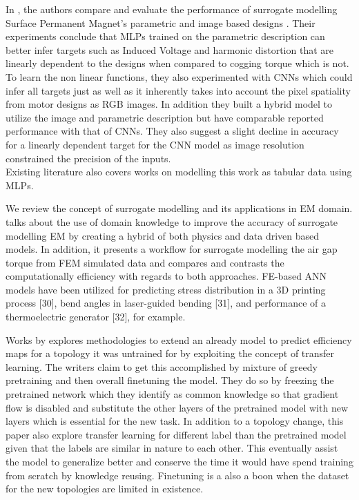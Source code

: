 \documentclass{report} %
\begin{document}
In \cite{EM SM-2023}, the authors compare and evaluate the performance of surrogate modelling Surface Permanent Magnet's parametric and image based designs .
Their experiments conclude that \ac{MLP}s trained on the parametric description can better infer targets such as Induced Voltage and harmonic distortion 
that are linearly dependent to the designs when compared to cogging torque which is not.
To learn the non linear functions, they also experimented with \ac{CNN}s which could infer all targets just as well as it inherently takes 
into account the pixel spatiality from motor designs as RGB images. In addition they built a hybrid model to utilize the image and parametric 
description but have comparable reported performance with that of \ac{CNN}s.
They also suggest a slight decline in accuracy for a linearly dependent target for the \ac{CNN} model as image resolution constrained the precision of the inputs.\\
Existing literature also covers works on modelling this work as tabular data using \ac{MLP}s. 

We review the concept of surrogate modelling and its applications in \ac{EM} domain.
\cite{SM EMT-2020} talks about the use of domain knowledge to improve the accuracy of surrogate modelling \ac{EM} by creating a hybrid of both physics and data driven based models.
In addition, it presents a workflow for surrogate modelling the air gap torque from \ac{FEM} simulated data and compares and contrasts the computationally efficiency with regards to both approaches. 
FE-based ANN models have been utilized for predicting stress distribution in a 3D printing process [30], bend angles in laser-guided bending [31], 
and performance of a thermoelectric generator [32], for example.

Works by \cite{EM TL-2020} explores methodologies to extend an already model to predict efficiency maps for a topology it was untrained for by exploiting 
the concept of transfer learning. The writers claim to get this accomplished by mixture of greedy pretraining and then overall finetuning the model.
They do so by freezing the pretrained network which they identify as common knowledge so that gradient flow is disabled and substitute the other 
layers of the pretrained model with new layers which is essential for the new task.
In addition to a topology change, this paper also explore transfer learning for different label than the pretrained model given that the labels are similar in nature to each other. 
This eventually assist the model to generalize better and conserve the time it would have spend training from scratch by knowledge reusing. 
Finetuning is a also a boon when the dataset for the new topologies are limited in existence.
\end{document}
